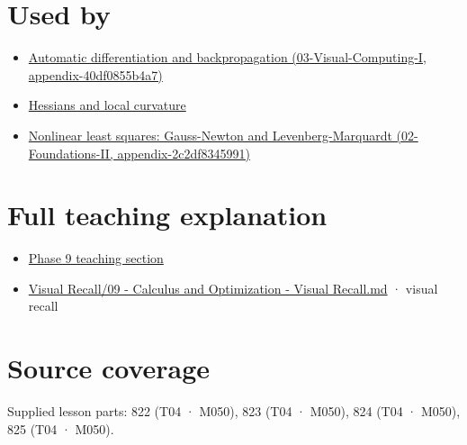 \section{Used by}\label{appendix-d8a7ddb675eb-used-by}

\begin{itemize}
\tightlist
\item
  \href{../03-Visual-Computing-I/main.pdf\#nameddest=appendix-40df0855b4a7}{Automatic differentiation and backpropagation (03-Visual-Computing-I, appendix-40df0855b4a7)}
\item
  \hyperref[appendix-6ac071f8b50c]{Hessians and local curvature}
\item
  \href{../02-Foundations-II/main.pdf\#nameddest=appendix-2c2df8345991}{Nonlinear least squares: Gauss-Newton and Levenberg-Marquardt (02-Foundations-II, appendix-2c2df8345991)}
\end{itemize}

\section{Full teaching explanation}\label{appendix-d8a7ddb675eb-full-teaching-explanation}

\begin{itemize}
\tightlist
\item
  \href{Continuous\%20Notes/Computing\%20Foundations\%20-\%20From\%20Bits\%20to\%20C++\%20and\%20Systems\%20APIs\#Jacobians,\%20curvature,\%20and\%20local\%20approximation}{Phase 9 teaching section}
\item
  \hyperref[appendix-adf48f5dc5c1]{Visual Recall/09 - Calculus and Optimization - Visual Recall.md} · visual recall
\end{itemize}

\section{Source coverage}\label{appendix-d8a7ddb675eb-source-coverage}

Supplied lesson parts: 822 (T04 · M050), 823 (T04 · M050), 824 (T04 · M050), 825 (T04 · M050).

